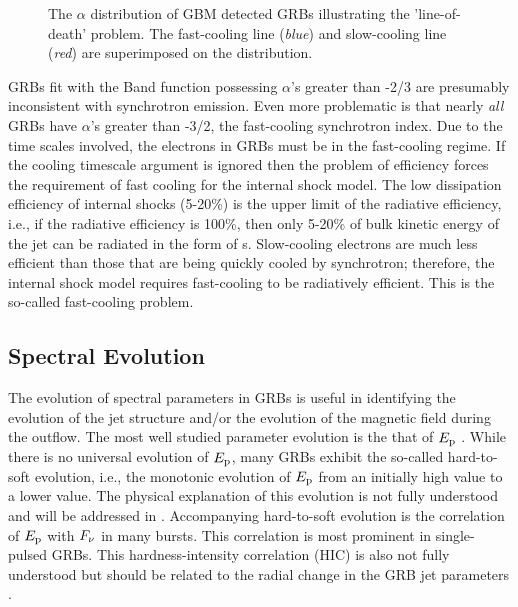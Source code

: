 \begin{figure}[h]
  \centering
  \caption{The $\alpha$ distribution
    of GBM detected GRBs illustrating the 'line-of-death' problem. The
    fast-cooling line (\emph{blue}) and slow-cooling line (\emph{red})
    are superimposed on the distribution.}
  \label{fig:lod}
\end{figure}
GRBs fit with the Band function possessing $\alpha$'s greater than
-2/3 are presumably inconsistent with synchrotron emission. Even more
problematic is that nearly \emph{all} GRBs have $\alpha$'s greater
than -3/2, the fast-cooling synchrotron index. Due to the time scales
involved, the electrons in GRBs must be in the fast-cooling regime. If
the cooling timescale argument is ignored then the problem of
efficiency forces the requirement of fast cooling for the internal
shock model. The low dissipation efficiency of internal shocks
(5-20\%) is the upper limit of the radiative efficiency, i.e., if the
radiative efficiency is 100\%, then only 5-20\% of bulk kinetic energy
of the jet can be radiated in the form of {\gray}s. Slow-cooling
electrons are much less efficient than those that are being quickly
cooled by synchrotron; therefore, the internal shock model requires
fast-cooling to be radiatively efficient. This is the so-called
fast-cooling problem.



\subsection{Spectral Evolution}
\label{sec:spec:evo}
The evolution of spectral parameters in GRBs is useful in identifying
the evolution of the jet structure and/or the evolution of the
magnetic field during the outflow. The most well studied parameter
evolution is the that of $E_{\rm p}$
\cite{Medvedev:2006,Liang:1997,Liang:1996,golenetskii:1983,Ryde:2001}. While
there is no universal evolution of $E_{\rm p}$, many GRBs exhibit the
so-called hard-to-soft evolution, i.e., the monotonic evolution of
$E_{\rm p}$ from an initially high value to a lower value. The physical
explanation of this evolution is not fully understood and will be
addressed in . Accompanying hard-to-soft evolution is the
correlation of $E_{\rm p}$ with $F_{\nu}$ in many bursts. This correlation is
most prominent in single-pulsed GRBs. This hardness-intensity
correlation (HIC) is also not fully understood but should be related
to the radial change in the GRB jet parameters \cite{preece:2013}.

